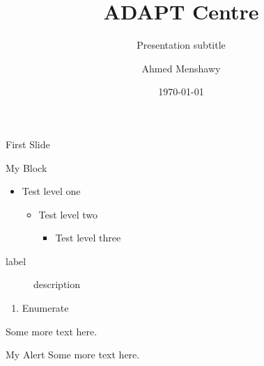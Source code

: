 \documentclass{beamer}
\title{ADAPT Centre}
\subtitle{Presentation subtitle}
\author{Ahmed Menshawy}
\date[\today]{\today}  %
\begin{document}
\frame{\titlepage}


\begin{frame}{First Slide}
\begin{block}{My Block}
\begin{itemize}
\item Test level one
    \begin{itemize}
    \item Test level two
        \begin{itemize}
        \item Test level three
        \end{itemize}
    \end{itemize}
\end{itemize}
\end{block}

\begin{description}
\item[label] description
\end{description}

\begin{enumerate}
\item Enumerate
\end{enumerate}

\begin{example}
Some more text here.
\end{example}

\begin{alert}{My Alert}
Some more text here.
\end{alert}
\end{frame}
\end{document}
